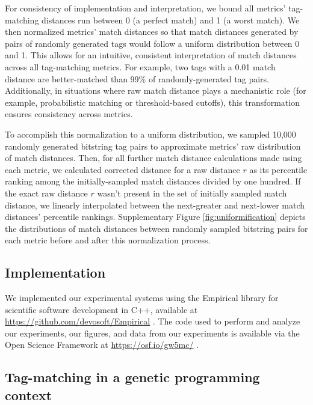 
For consistency of implementation and interpretation, we bound all metrics' tag-matching distances run between 0 (a perfect match) and 1 (a worst match).
We then normalized metrics' match distances so that match distances generated by pairs of randomly generated tags would follow a uniform distribution between 0 and 1.
This allows for an intuitive, consistent interpretation of match distances across all tag-matching metrics.
For example, two tags with a 0.01 match distance are better-matched than 99\% of randomly-generated tag pairs.
Additionally, in situations where raw match distance plays a mechanistic role (for example, probabilistic matching or threshold-based cutoffs), this transformation ensures consistency across metrics.

To accomplish this normalization to a uniform distribution, we sampled 10,000 randomly generated bitstring tag pairs to approximate metrics' raw distribution of match distances.
Then, for all further match distance calculations made using each metric, we calculated corrected distance for a raw distance $r$ as its percentile ranking among the initially-sampled match distances divided by one hundred.
If the exact raw distance $r$ wasn't present in the set of initially sampled match distance, we linearly interpolated between the next-greater and next-lower match distances' percentile rankings.
Supplementary Figure \ref{fig:uniformification} depicts the distributions of match distances between randomly sampled bitstring pairs for each metric before and after this normalization process.

\subsection{Implementation}

We implemented our experimental systems using the Empirical library for scientific software development in C++, available at \url{https://github.com/devosoft/Empirical} \citep{charles_ofria_2019_2575607}.
The code used to perform and analyze our experiments, our figures, and data from our experiments is available via the Open Science Framework at \url{https://osf.io/gw5mc/} \citep{foster2017open}.

\subsection{Tag-matching in a genetic programming context}

